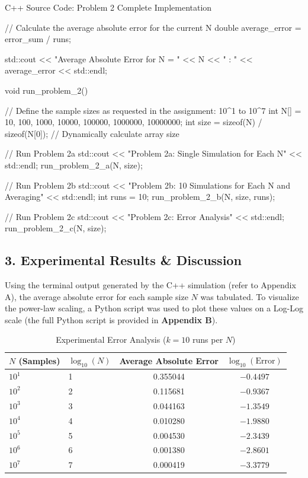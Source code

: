 \documentclass{article}
\begin{document}
\begin{codebox}{C++ Source Code: Problem 2 Complete Implementation}
{{        // Calculate the average absolute error for the current N
        double average_error = error_sum / runs;

        std::cout << "Average Absolute Error for N = "
                  << N << " : "
                  << average_error << std::endl;
    }
}

void run_problem_2(){
    // Define the sample sizes as requested in the assignment: 10^1 to 10^7
    int N[] =  {10, 100, 1000, 10000, 100000, 1000000, 10000000};
    int size = sizeof(N) / sizeof(N[0]); // Dynamically calculate array size
    
    // Run Problem 2a
    std::cout << "\nRunning Problem 2a: Single Simulation for Each N" << std::endl;
    run_problem_2_a(N, size);
    
    // Run Problem 2b 
    std::cout << "\nRunning Problem 2b: 10 Simulations for Each N and Averaging" << std::endl;
    int runs = 10;
    run_problem_2_b(N, size, runs);
    
    // Run Problem 2c
    std::cout << "\nRunning Problem 2c: Error Analysis" << std::endl;
    run_problem_2_c(N, size);
}

\end{codebox}
\newpage
\subsection*{3. Experimental Results \& Discussion}
Using the terminal output generated by the C++ simulation (refer to Appendix A), the average absolute error for each sample size $N$ was tabulated. To visualize the power-law scaling, a Python script was used to plot these values on a Log-Log scale (the full Python script is provided in \textbf{Appendix B}).

\begin{table}[h]
    \centering
    \caption{Experimental Error Analysis ($k=10$ runs per $N$)}
    \begin{tabular}{@{}llcc@{}}
        \toprule
        $N$ (Samples) & $\log_{10}(N)$ & Average Absolute Error & $\log_{10}(\text{Error})$ \\ \midrule
        $10^1$        & 1              & 0.355044              & $-0.4497$                 \\
        $10^2$        & 2              & 0.115681              & $-0.9367$                 \\
        $10^3$        & 3              & 0.044163              & $-1.3549$                 \\
        $10^4$        & 4              & 0.010280              & $-1.9880$                 \\
        $10^5$        & 5              & 0.004530              & $-2.3439$                 \\
        $10^6$        & 6              & 0.001380              & $-2.8601$                 \\
        $10^7$        & 7              & 0.000419              & $-3.3779$                 \\ \bottomrule
    \end{tabular}
\end{table}
\end{document}
